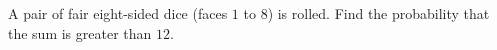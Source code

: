 A pair of fair eight-sided dice (faces $1$ to $8$) is rolled. Find the probability that the sum is greater than $12$.
